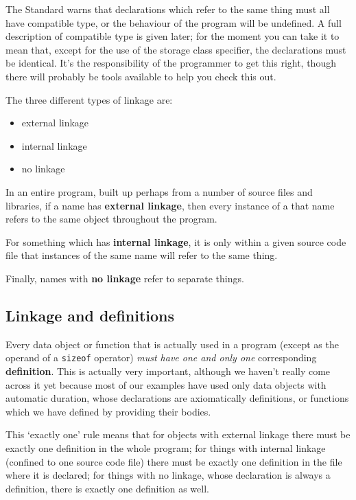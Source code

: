    The Standard warns that declarations which refer to the same thing
    must all have compatible type, or the behaviour of the program will be
    undefined. A full description of compatible type is given later; for the
    moment you can take it to mean that, except for the use of the storage
    class specifier, the declarations must be identical. It's the
    responsibility of the programmer to get this right, though there will
    probably be tools available to help you check this out.


   The three different types of linkage are:


   \begin{itemize}
    \item external linkage
    \item internal linkage
    \item no linkage
   \end{itemize}

   In an entire program, built up perhaps from a number of source files
    and libraries, if a name has \textbf{external linkage}, then every
    instance of a that name refers to the same object throughout the
    program.


   For something which has \textbf{internal linkage}, it is only within
    a given source code file that instances of the same name will refer to
    the same thing.


   Finally, names with \textbf{no linkage} refer to separate
    things.


  

  \subsection{Linkage and definitions}
   

   Every data object or function that is actually used in a program
    (except as the operand of a \texttt{sizeof} operator) \textit{must have
    one and only one} corresponding \textbf{definition}. This is
    actually very important, although we haven't really come across it yet
    because most of our examples have used only data objects with automatic
    duration, whose declarations are axiomatically definitions, or functions
    which we have defined by providing their bodies.


   This `exactly one' rule means that for objects with external
    linkage there must be exactly one definition in the whole program; for
    things with internal linkage (confined to one source code file) there
    must be exactly one definition in the file where it is declared; for
    things with no linkage, whose declaration is always a definition, there
    is exactly one definition as well.


